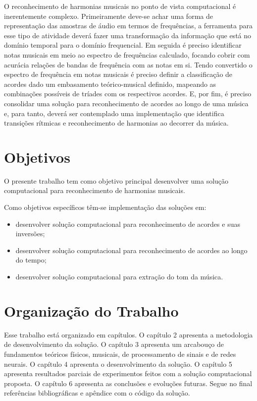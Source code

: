 O reconhecimento de harmonias musicais no ponto de vista computacional é inerentemente complexo. Primeiramente deve-se achar uma forma de representação das amostras de áudio em termos de frequências, a ferramenta para esse tipo de atividade deverá fazer uma transformação da informação que está no domínio temporal para o domínio frequencial. Em seguida é preciso identificar notas musicais em meio ao espectro de frequências calculado, focando cobrir com acurácia relações de bandas de frequência com as notas em si. Tendo convertido o espectro de frequência em notas musicais é preciso definir a classificação de acordes dado um embasamento teórico-musical definido, mapeando as combinações possíveis de tríades com os respectivos acordes. E, por fim, é preciso consolidar uma solução para reconhecimento de acordes ao longo de uma música e, para tanto, deverá ser contemplado uma implementação que identifica transições rítmicas e reconhecimento de harmonias ao decorrer da música.

\section{Objetivos}
\label{sec:objetivos}

O presente trabalho tem como objetivo principal desenvolver uma solução computacional para reconhecimento de harmonias musicais.

Como objetivos específicos têm-se implementação das soluções em:
\begin{itemize}
\item desenvolver solução computacional para reconhecimento de acordes e suas inversões;
\item desenvolver solução computacional para reconhecimento de acordes ao longo do tempo;
\item desenvolver solução computacional para extração do tom da música.
\end{itemize}


\section{Organização do Trabalho}
\label{sec:organizacao}

Esse trabalho está organizado em capítulos. O capítulo 2 apresenta a metodologia de desenvolvimento da solução. O capítulo 3 apresenta um arcabouço de fundamentos teóricos físicos, musicais, de processamento de sinais e de redes neurais. O capítulo 4 apresenta o desenvolvimento da solução. O capítulo 5 apresenta resultados parciais de experimentos feitos com a solução computacional proposta. O capítulo 6 apresenta as conclusões e evoluções futuras. Segue no final referências bibliográficas e apêndice com o código da solução.
